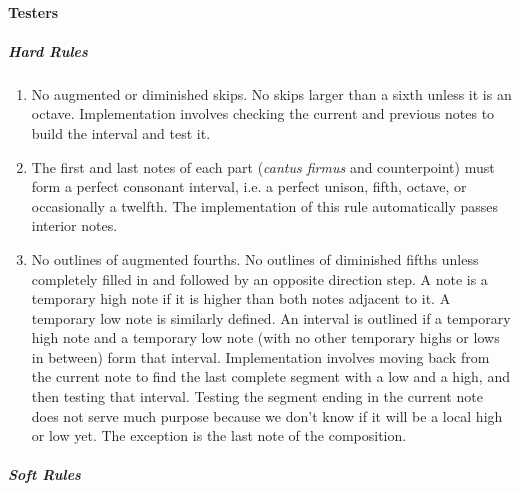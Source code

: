 \paragraph{Testers}
\subparagraph{Hard Rules}
	\begin{enumerate}
		\item No augmented or diminished skips. No skips larger than a sixth unless it is an octave.
					Implementation involves checking the current and previous notes to build the interval and test it.

		\item The first and last notes of each part (\emph{cantus firmus} and counterpoint) must form a perfect consonant interval, i.e. a perfect unison, fifth, octave, or occasionally a twelfth.
          The implementation of this rule automatically passes interior notes.

		\item No outlines of augmented fourths. No outlines of diminished fifths unless completely filled in and followed by an opposite direction step.
          A note is a temporary high note if it is higher than both notes adjacent to it. A temporary low note is similarly defined.
          An interval is outlined if a temporary high note and a temporary low note (with no other temporary highs or lows in between) form that interval.
					Implementation involves moving back from the current note to find the last complete segment with a low and a high, and then testing that interval.
					Testing the segment ending in the current note does not serve much purpose because we don't know if it will be a local high or low yet. The exception is the last note of the composition.

	\end{enumerate}
\subparagraph{Soft Rules}
